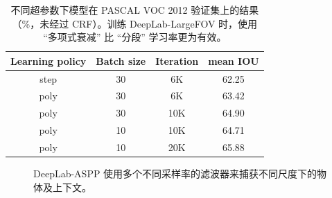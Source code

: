 \begin{table}[!t]
  \centering
  \addtolength{\tabcolsep}{2.5pt}
  \begin{tabular}{c c c c}
    \toprule[0.2 em]
    {\bf Learning policy} & {\bf Batch size} & {\bf Iteration} & {\bf mean IOU} \\
    \toprule[0.2em]
    step & 30 & 6K & 62.25 \\
    \midrule
    poly & 30 & 6K & 63.42 \\
    poly & 30 & 10K & 64.90 \\
    poly & 10 & 10K & 64.71 \\
    poly & 10 & 20K & 65.88 \\
    \bottomrule[0.1em]
  \end{tabular}
  \caption{不同超参数下模型在 PASCAL VOC 2012 验证集上的结果（\%，未经过 CRF）。训练 DeepLab-LargeFOV 时，使用 ``多项式衰减'' 比 ``分段'' 学习率更为有效。}
  \label{tab:val_poly}
\end{table}

\begin{figure}[!t]
  \centering
  \caption{DeepLab-ASPP 使用多个不同采样率的滤波器来捕获不同尺度下的物体及上下文。}
  \label{fig:diff_hole}
\end{figure}

